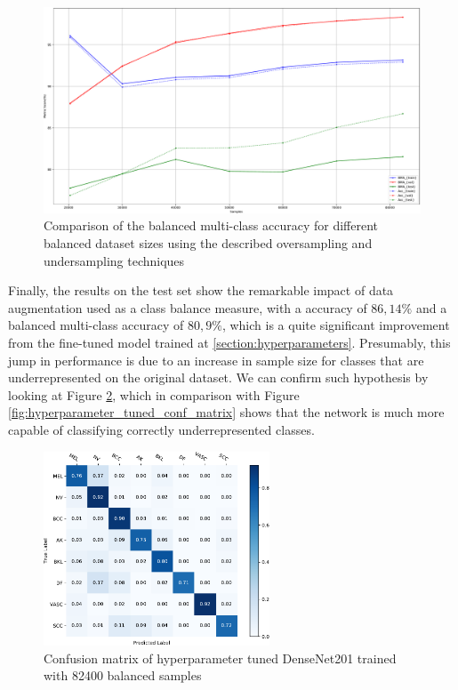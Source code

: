     \begin{figure}[ht]
        \centering
        \includegraphics[width=\textwidth]{figs/densenet201_balanced_samples_metrics_comp.pdf}
        \caption{Comparison of the balanced multi-class accuracy for different balanced dataset sizes using the described oversampling and undersampling techniques}
        \label{fig:densenet201_balanced_samples_metrics_comp}
    \end{figure}

    Finally, the results on the test set show the remarkable impact of data augmentation used as a class balance measure, with a accuracy of $86,14\%$ and a balanced multi-class accuracy of $80,9\%$, which is a quite significant improvement from the fine-tuned model trained at \autoref{section:hyperparameters}. Presumably, this jump in performance is due to an increase in sample size for classes that are underrepresented on the original dataset. We can confirm such hypothesis by looking at Figure \ref{fig:82400_balanced_conf_matrix}, which in comparison with Figure \ref{fig:hyperparameter_tuned_conf_matrix} shows that the network is much more capable of classifying correctly underrepresented classes. \par
    \begin{figure}[ht]
        \centering
        \includegraphics[width=0.6\textwidth]{figs/densenet201_82400_balanced_conf_matrix.pdf}
        \caption{Confusion matrix of hyperparameter tuned DenseNet201 trained with 82400 balanced samples}
        \label{fig:82400_balanced_conf_matrix}
    \end{figure}
    
